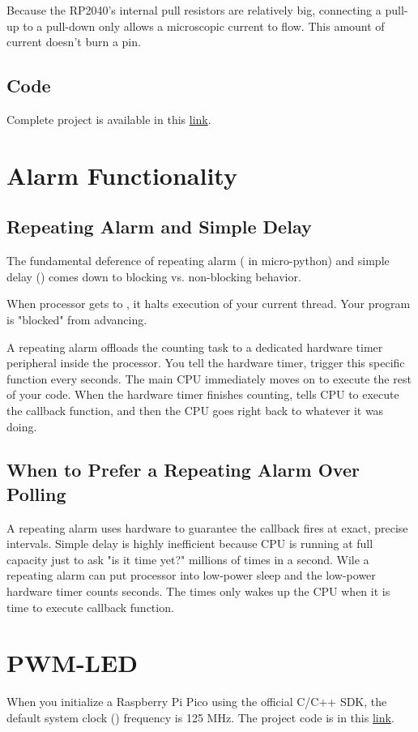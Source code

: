 \documentclass[12pt]{article}
\begin{document}
	
	Because the RP2040's internal pull resistors are relatively big, connecting a pull-up to a pull-down only allows a microscopic current to flow. This amount of current doesn't burn a pin.
	
	\subsection{Code}
	Complete project is available in this \href{https://wokwi.com/projects/468010017252001793}{link}.

	\section{Alarm Functionality}
	\subsection{Repeating Alarm and Simple Delay}
		The fundamental deference of repeating alarm ( in micro-python) and simple delay () comes down to blocking vs. non-blocking behavior.
		
		When processor gets to , it halts execution of your current thread. Your program is "blocked" from advancing.
		
		
	A repeating alarm offloads the counting task to a dedicated hardware timer peripheral inside the processor. You tell the hardware timer, trigger this specific function every  seconds. The main CPU immediately moves on to execute the rest of your code. When the hardware timer finishes counting, tells CPU to execute the callback function, and then the CPU goes right back to whatever it was doing.
	
	\subsection{When to Prefer a Repeating Alarm Over Polling}
	A repeating alarm uses hardware to guarantee the callback fires at exact, precise intervals. Simple delay is highly inefficient because CPU is running at full capacity just to ask "is it time yet?" millions of times in a second. Wile a repeating alarm can put processor into low-power sleep and the low-power hardware timer counts seconds. The times only wakes up the CPU when it is time to execute callback function.
	
	\section{PWM-LED}
	When you initialize a Raspberry Pi Pico using the official C/C++ SDK, the default system clock () frequency is 125 MHz.
	The project code is in this \href{https://wokwi.com/projects/468328763196143617}{link}.
	
\end{document}
